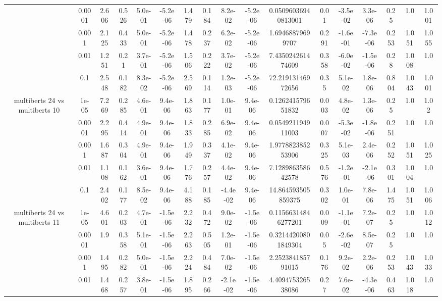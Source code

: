 \begin{tabular}{|c|c|c|c|c|c|c|c|c|c|c|c|c|c|c|c|c|}
 & 0.0001 & 2.606 & 0.526 & 5.0e-01 & -5.2e-06 & 1.479 & 0.184 & 8.2e-02 & -5.2e-06 & 0.05096036940813001 & 0.01 & -3.5e-02 & 3.3e-06 & 0.25 & 1.0 & 1.001 \\
 & 0.001 & 2.125 & 0.433 & 5.0e-01 & -5.2e-06 & 1.478 & 0.237 & 6.2e-02 & -5.2e-06 & 1.69468879699707 & 0.291 & -1.6e-01 & -7.3e-06 & 0.253 & 1.051 & 1.055 \\
 & 0.01 & 1.251 & 0.21 & 3.7e-01 & -5.2e-06 & 1.506 & 0.222 & 3.7e-02 & -5.2e-06 & 7.435024261474609 & 0.358 & -6.0e-02 & -1.5e-06 & 0.28 & 1.008 & 1.0 \\
 & 0.1 & 2.548 & 0.182 & 8.3e-02 & -5.2e-06 & 2.569 & 0.114 & 1.2e-03 & -5.2e-06 & 72.21913146972656 & 0.35 & 5.1e-02 & 1.8e-06 & 0.804 & 1.043 & 1.001 \\
\hline
\multirow{5}{*}{multiberts 24 vs multiberts 10} & 1e-05 & 7.269 & 0.285 & 4.6e-01 & 9.4e-06 & 1.863 & 0.177 & 1.0e-01 & 9.4e-06 & 0.126241579651832 & 0.003 & 4.8e-02 & 1.3e-06 & 0.25 & 1.0 & 1.02 \\
 & 0.0001 & 2.295 & 0.414 & 4.9e-01 & 9.4e-06 & 1.833 & 0.285 & 6.9e-02 & 9.4e-06 & 0.054921194911003 & 0.007 & -5.3e-02 & -1.8e-06 & 0.251 & 1.0 & 1.0 \\
 & 0.001 & 1.687 & 0.304 & 4.9e-01 & 9.4e-06 & 1.949 & 0.337 & 4.1e-02 & 9.4e-06 & 1.977882385253906 & 0.325 & 5.1e-03 & 2.4e-06 & 0.252 & 1.051 & 1.025 \\
 & 0.01 & 1.108 & 0.162 & 3.6e-01 & 9.4e-06 & 1.776 & 0.257 & 4.4e-02 & 9.4e-06 & 7.128986358642578 & 0.576 & -1.2e-01 & -2.1e-06 & 0.301 & 1.004 & 1.0 \\
 & 0.1 & 2.402 & 0.177 & 8.5e-02 & 9.4e-06 & 4.188 & 0.185 & -4.4e-02 & 9.4e-06 & 14.864593505859375 & 0.302 & 1.0e-01 & 7.8e-06 & 1.475 & 1.051 & 1.006 \\
\hline
\multirow{5}{*}{multiberts 24 vs multiberts 11} & 1e-05 & 4.601 & 0.203 & 4.7e-01 & -1.5e-06 & 2.232 & 0.472 & 9.0e-02 & -1.5e-06 & 0.11566314846277201 & 0.009 & -1.1e-01 & 7.2e-07 & 0.25 & 1.0 & 1.012 \\
 & 0.0001 & 1.9 & 0.358 & 5.1e-01 & -1.5e-06 & 2.263 & 0.505 & 1.2e-01 & -1.5e-06 & 0.32144200801849304 & 0.05 & -2.6e-02 & 8.5e-07 & 0.25 & 1.0 & 1.0 \\
 & 0.001 & 1.495 & 0.282 & 5.0e-01 & -1.5e-06 & 2.224 & 0.484 & 7.0e-02 & -1.5e-06 & 2.252384185791015 & 0.176 & 9.2e-02 & 2.2e-06 & 0.253 & 1.043 & 1.033 \\
 & 0.01 & 1.468 & 0.257 & 3.8e-01 & -1.5e-06 & 1.895 & 0.266 & -2.1e-02 & -1.5e-06 & 4.409475326538086 & 0.27 & 7.6e-02 & -4.3e-06 & 0.463 & 1.018 & 1.0 \\

\end{tabular}
